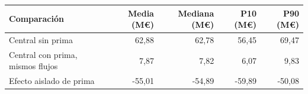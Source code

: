 \begin{tabular}{lrrrr}
\toprule
Comparación & Media (M€) & Mediana (M€) & P10 (M€) & P90 (M€) \\
\midrule
Central sin prima & 62,88 & 62,78 & 56,45 & 69,47 \\
Central con prima, mismos flujos & 7,87 & 7,82 & 6,07 & 9,83 \\
Efecto aislado de prima & -55,01 & -54,89 & -59,89 & -50,08 \\
\bottomrule
\end{tabular}
